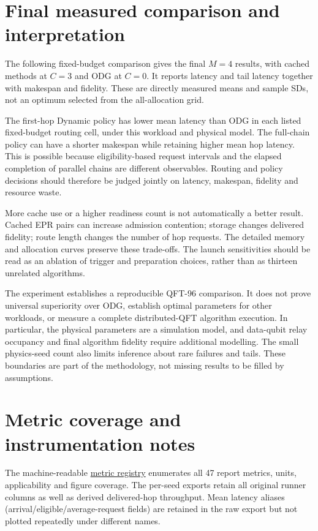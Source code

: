 \documentclass[10pt,a4paper,oneside]{report}
\newcommand{\repo}{https://github.com/sanjeevkrishnaa/Compiler-Driven-ACE}
\newcommand{\datablob}{\repo/blob/codex/ace-scheduler-correctness/docs/latex/qft96_final/data}
\begin{document}
\chapter{Final measured comparison and interpretation}
The following fixed-budget comparison gives the final $M=4$ results, with cached methods at $C=3$ and ODG at $C=0$. It reports latency and tail latency together with makespan and fidelity. These are directly measured means and sample SDs, not an optimum selected from the all-allocation grid.


The first-hop Dynamic policy has lower mean latency than ODG in each listed fixed-budget routing cell, under this workload and physical model. The full-chain policy can have a shorter makespan while retaining higher mean hop latency. This is possible because eligibility-based request intervals and the elapsed completion of parallel chains are different observables. Routing and policy decisions should therefore be judged jointly on latency, makespan, fidelity and resource waste.

More cache use or a higher readiness count is not automatically a better result. Cached EPR pairs can increase admission contention; storage changes delivered fidelity; route length changes the number of hop requests. The detailed memory and allocation curves preserve these trade-offs. The launch sensitivities should be read as an ablation of trigger and preparation choices, rather than as thirteen unrelated algorithms.

The experiment establishes a reproducible QFT-96 comparison. It does not prove universal superiority over ODG, establish optimal parameters for other workloads, or measure a complete distributed-QFT algorithm execution. In particular, the physical parameters are a simulation model, and data-qubit relay occupancy and final algorithm fidelity require additional modelling. The small physics-seed count also limits inference about rare failures and tails. These boundaries are part of the methodology, not missing results to be filled by assumptions.

\appendix
\chapter{Metric coverage and instrumentation notes}
The machine-readable \href{\datablob/metric_registry.csv}{metric registry} enumerates all 47 report metrics, units, applicability and figure coverage. The per-seed exports retain all original runner columns as well as derived delivered-hop throughput. Mean latency aliases (arrival/eligible/average-request fields) are retained in the raw export but not plotted repeatedly under different names.
\end{document}
